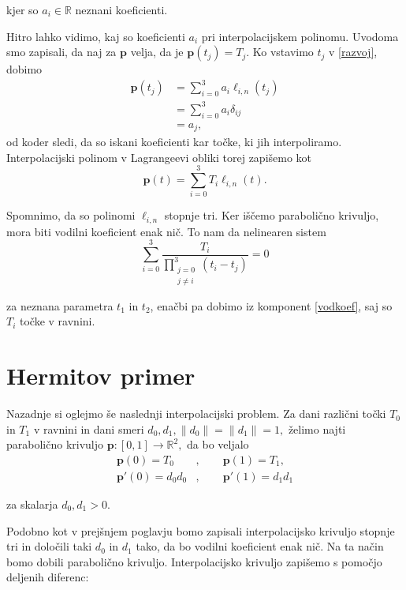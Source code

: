 \documentclass[mat1]{fmfdelo}
\newcommand{\R}{\mathbb R}
\begin{document}
kjer so $a_i \in \R$ neznani koeficienti.

Hitro lahko vidimo, kaj so koeficienti $a_i$ pri interpolacijskem polinomu. Uvodoma smo zapisali, da naj za $\textbf{p}$ velja, da je $\textbf{p}(t_j) = T_j$. Ko vstavimo $t_j$ v \eqref{razvoj}, dobimo
\begin{align*}
\textbf{p}(t_j) &=  \sum_{i=0}^{3} a_i \ell_{i,n}(t_j) \\
	 &= \sum_{i=0}^{3} a_i \delta_{ij} \\
	&= a_j
,\end{align*}
od koder sledi, da so iskani koeficienti kar točke, ki jih interpoliramo. Interpolacijski polinom v Lagrangeevi obliki torej zapišemo kot 
$$\textbf{p}(t) = \sum_{i=0}^{3} T_i \ell_{i,n}(t).$$

Spomnimo, da so polinomi $\ell_{i,n}$ stopnje tri. Ker iščemo parabolično krivuljo, mora biti vodilni koeficient enak nič. To nam da nelinearen sistem
\begin{equation}\label{vodkoef}
\sum_{i = 0}^{3} \frac{T_i}{\prod_{\substack{j = 0 \\ j \neq i}}^3(t_i - t_j)} = 0
\end{equation}

za neznana parametra $t_1$ in $t_2$, enačbi pa dobimo iz komponent \eqref{vodkoef}, saj so $T_i$ točke v ravnini.


\section{Hermitov primer}

Nazadnje si oglejmo še naslednji interpolacijski problem. Za dani različni točki $T_0$ in $T_1$ v ravnini in dani smeri $d_0, d_1, \lVert d_0 \rVert = \lVert d_1 \rVert = 1,$ želimo najti parabolično krivuljo $\textbf{p} : [ 0, 1 ] \rightarrow \R^2,$ da bo veljalo
\begin{align*}
\textbf{p}(0) = T_0&, \qquad \textbf{p}(1) = T_1, \\
\textbf{p}'(0) = d_0 d_0&, \qquad \textbf{p}'(1) = d_1 d_1 
\end{align*}

za skalarja $d_0, d_1 > 0$.

Podobno kot v prejšnjem poglavju bomo zapisali interpolacijsko krivuljo stopnje tri in določili taki $d_0$ in $d_1$ tako, da bo vodilni koeficient enak nič. Na ta način bomo dobili parabolično krivuljo. Interpolacijsko krivuljo zapišemo s pomočjo deljenih diferenc:
\end{document}
